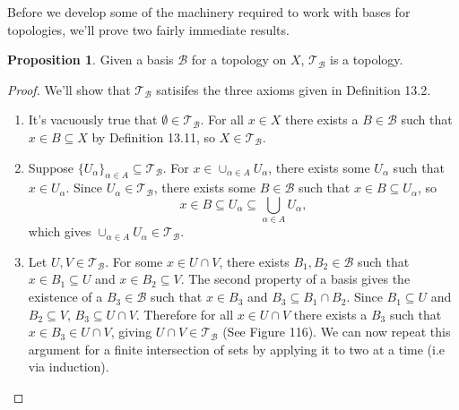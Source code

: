 \documentclass{article}
\newcommand{\T}{\mathcal{T}}
\theoremstyle{definition}
\newtheorem{proposition}{Proposition}[section]
\begin{document}
	Before we develop some of the machinery required to work with bases for topologies, we'll prove two fairly immediate results. 
	\begin{proposition}
		Given a basis $\mathscr B$ for a topology on $X$, $\T_{\mathscr B}$ is a topology.
	\end{proposition}
	\begin{proof}
		We'll show that $\T_{\mathscr B}$ satisifes the three axioms given in Definition 13.2.
		\begin{enumerate}
			\item It's vacuously true that $\emptyset \in \T_{\mathscr B}$. For all $x\in X$ there exists a $B\in\mathscr{B}$ such that $x\in B\subseteq X$ by Definition 13.11, so $X\in \T_{\mathscr B}$.
			\item Suppose $\{U_\alpha\}_{\alpha\in A}\subseteq \T_{\mathscr B}$. For $x\in \cup_{\alpha \in A} U_\alpha$, there exists some $U_\alpha$ such that $x\in U_\alpha$. Since $U_\alpha \in \T_{\mathscr B}$, there exists some $B\in \mathscr{B}$ such that $x\in B\subseteq U_\alpha$, so 
			$$ x\in B\subseteq U_\alpha \subseteq \bigcup_{\alpha\in A}U_\alpha,$$ which gives $ \cup_{\alpha \in A} U_\alpha\in\T_{\mathscr B}$.
			\item  Let $U,V\in\T_{\mathscr B}$. For some $x\in U\cap V$, there exists $B_1,B_2\in\mathscr{B}$ such that $x\in B_1\subseteq U$ and $x\in B_2\subseteq V$. The second property of a basis gives the existence of a $B_3\in\mathscr{B}$ such that $x\in B_3$ and $B_3\subseteq B_1\cap B_2$. Since $B_1\subseteq U$ and $B_2\subseteq V$, $B_3\subseteq U\cap V$. Therefore for all $x\in U\cap V$ there exists a $B_3$ such that $x\in B_3\in U\cap V$, giving $U\cap V\in \T_{\mathscr B}$ (See Figure 116). We can now repeat this argument for a finite intersection of sets by applying it to two at a time (i.e via induction).
		\begin{figure}[h!]
				\centering
				\caption{} 
			\end{figure}
			
		\end{enumerate}
	\end{proof}
\end{document}
